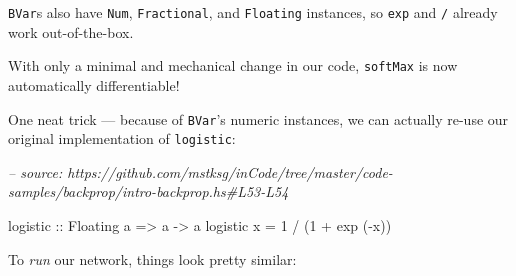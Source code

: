 \documentclass[]{article}
\newenvironment{Shaded}{}{}
\newcommand{\CommentTok}[1]{\textcolor[rgb]{0.38,0.63,0.69}{\textit{#1}}}
\newcommand{\DataTypeTok}[1]{\textcolor[rgb]{0.56,0.13,0.00}{#1}}
\newcommand{\DecValTok}[1]{\textcolor[rgb]{0.25,0.63,0.44}{#1}}
\newcommand{\FunctionTok}[1]{\textcolor[rgb]{0.02,0.16,0.49}{#1}}
\newcommand{\KeywordTok}[1]{\textcolor[rgb]{0.00,0.44,0.13}{\textbf{#1}}}
\newcommand{\NormalTok}[1]{#1}
\newcommand{\OtherTok}[1]{\textcolor[rgb]{0.00,0.44,0.13}{#1}}
\begin{document}
\texttt{BVar}s also have \texttt{Num}, \texttt{Fractional}, and
\texttt{Floating} instances, so \texttt{exp} and \texttt{/} already work
out-of-the-box.

With only a minimal and mechanical change in our code, \texttt{softMax} is now
automatically differentiable!

One neat trick --- because of \texttt{BVar}'s numeric instances, we can actually
re-use our original implementation of \texttt{logistic}:

\begin{Shaded}
\begin{Highlighting}[]
\CommentTok{-- source: https://github.com/mstksg/inCode/tree/master/code-samples/backprop/intro-backprop.hs#L53-L54}

\OtherTok{logistic ::} \DataTypeTok{Floating}\NormalTok{ a }\OtherTok{=>}\NormalTok{ a }\OtherTok{->}\NormalTok{ a}
\NormalTok{logistic x }\FunctionTok{=} \DecValTok{1} \FunctionTok{/}\NormalTok{ (}\DecValTok{1} \FunctionTok{+}\NormalTok{ exp (}\FunctionTok{-}\NormalTok{x))}
\end{Highlighting}
\end{Shaded}

To \emph{run} our network, things look pretty similar:

\begin{Shaded}
\end{Shaded}
\end{document}

